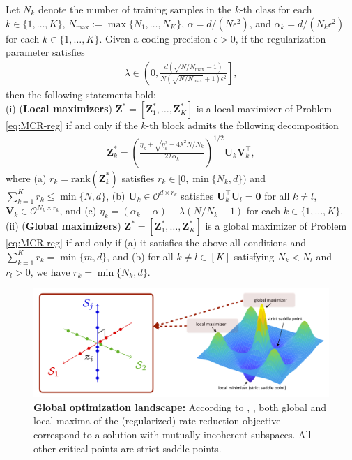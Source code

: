 \documentclass[../../book-main.tex]{subfiles}
\begin{document}
\begin{theorem}\label{thm:mcr-global-opt}
	Let $N_k$ denote the number of training samples in the $k$-th class for each $k \in \{1,\dots,K\}$, $N_{\max} := \max\{N_1,\dots,N_K\}$, $\alpha=d/(N\epsilon^2)$, and $\alpha_{k} = d/(N_k\epsilon^2)$ for each $k \in \{1,\dots,K\}$. Given a coding precision $\epsilon > 0$, if the regularization parameter satisfies
	\begin{align}\label{eq:lambda}
		\lambda \in \left(0, \frac{d(\sqrt{N/N_{\max}}-1)}{N(\sqrt{N/N_{\max}}+1)\epsilon^2} \right],
	\end{align}
	then the following statements hold: \\
	(i) ({\bf Local maximizers}) $\bm Z^* = \left[\bm Z_1^*,\dots,\bm Z_K^* \right]$ is a local maximizer of Problem \eqref{eq:MCR-reg} if and only if the $k$-th block admits the following decomposition
	\begin{align}\label{eq:Zk opti}
		\bm Z_k^* = \left(\frac{ \eta_k + \sqrt{\eta_k^2 - 4\lambda^2N/N_k}}{2\lambda \alpha_{k}}\right)^{1/2} \bm U_k \bm V_k^\top,
	\end{align}
	where (a) $r_k = \mathrm{rank}(\bm Z_k^*)$ satisfies $r_k \in [0,\min\{N_k,d\})$ and $\sum_{k=1}^K r_k \le \min\{N,d\}$, (b) $\bm U_k \in \mathcal{O}^{d \times r_k}$ satisfies $\bm U_k^{\top}\bm U_l = \bm 0$ for all $k \neq l$, $\bm V_k \in \mathcal{O}^{N_k \times r_k}$, and (c) $\eta_k=(\alpha_k-\alpha) - \lambda(N/N_k+1)$ for each $k\in \{1,\dots,K\}$.
	\\
	(ii) ({\bf Global maximizers}) $\bm Z^* = \left[\bm Z_1^*,\dots,\bm Z_K^* \right]$ is a global maximizer of Problem \eqref{eq:MCR-reg} if and only if (a) it satisfies the above all conditions and $\sum_{k=1}^K r_k = \min\{m,d\}$, and (b) for all $k \neq l \in [K]$ satisfying $N_k < N_l$ and $r_l > 0$, we have $r_k = \min\{N_k,d\}$.
\end{theorem}

\begin{figure}[t]
	\centering
	\includegraphics[width=0.8\linewidth]{chapters/chapter3/figs/mcr2-global-local.png}
	\caption{{\bf Global optimization landscape:} According to \cite{sun2015nonconvex,lee2016gradient}, , both global and local maxima of the (regularized) rate reduction objective correspond to a solution with mutually incoherent subspaces. All other critical points are strict saddle points.}
	\label{fig:mcr-global-local}
\end{figure}
\end{document}
